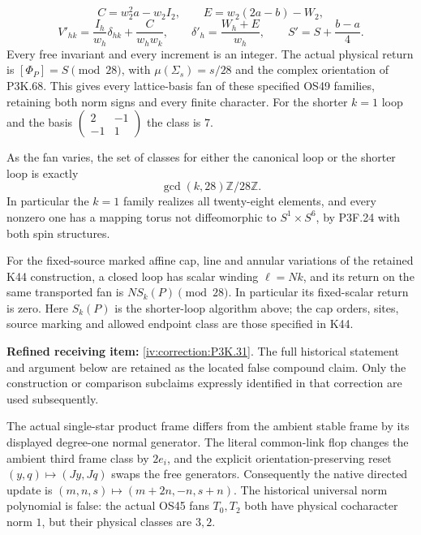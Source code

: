 \begin{theorem}
\[
 C=w_2^2a-w_2I_2,\qquad E=w_2(2a-b)-W_2,
\]
\[
 V'_{hk}=\frac{I_h}{w_h}\delta_{hk}+\frac{C}{w_hw_k},\qquad
 \delta'_h=\frac{W_h+E}{w_h},\qquad
 S'=S+\frac{b-a}{4}.                                 \tag{OF.3}
\]
Every free invariant and every increment is an integer. The
actual physical return is \([\Phi_P]=S\pmod {28}\), with
\(\mu(\Sigma_s)=s/28\) and the complex orientation of P3K.68.
This gives every lattice-basis fan of these specified OS49
families, retaining both norm signs and every finite character.
For the shorter \(k=1\) loop and the basis
\(\left(\begin{smallmatrix}2&-1\\-1&1\end{smallmatrix}\right)\)
the class is \(7\).

As the fan varies, the set of classes for either the canonical
loop or the shorter loop is exactly
\[
                    \gcd(k,28)\mathbb Z/28\mathbb Z. \tag{OF.4}
\]
In particular the \(k=1\) family realizes all twenty-eight
elements, and every nonzero one has a mapping torus not
diffeomorphic to \(S^1\times S^6\), by P3F.24 with both spin
structures.

For the fixed-source marked affine cap, line and annular
variations of the retained K44 construction, a closed loop
has scalar winding \(\ell=Nk\), and its return on the
same transported fan is \(N S_k(P)\pmod {28}\).
In particular its fixed-scalar return is zero. Here
\(S_k(P)\) is the shorter-loop algorithm above; the
cap orders, sites, source marking and allowed endpoint
class are those specified in K44.
\end{theorem}

\begin{theorem}\hypertarget{tag-02UC}{}\label{night:P3K.31}

\par\noindent\textbf{Refined receiving item:} \cref{iv:correction:P3K.31}. The full historical statement and argument below are retained as the located false compound claim. Only the construction or comparison subclaims expressly identified in that correction are used subsequently.

The actual single-star product frame differs from the ambient
stable frame by its displayed degree-one normal generator.
The literal common-link flop changes the ambient third frame
class by \(2e_i\), and the explicit orientation-preserving reset
\((y,q)\mapsto(Jy,Jq)\) swaps the free generators.
Consequently the native directed update is
\((m,n,s)\mapsto(m+2n,-n,s+n)\).
The historical universal norm polynomial is false: the actual
OS45 fans \(T_0,T_2\) both have physical cocharacter norm \(1\),
but their physical classes are \(3,2\).
\end{theorem}

